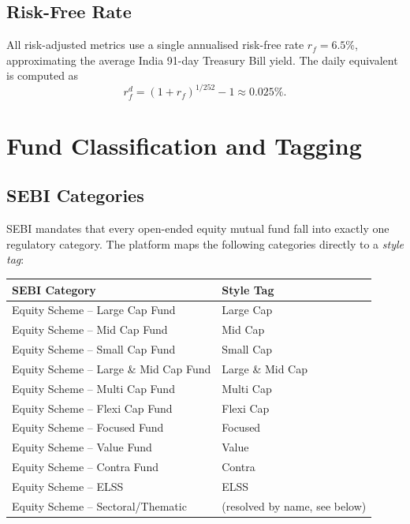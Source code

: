 \documentclass[12pt, a4paper]{article}
\newcommand{\rf}{r_f}
\begin{document}
\subsection{Risk-Free Rate}

All risk-adjusted metrics use a single annualised risk-free rate
$\rf = 6.5\%$, approximating the average India 91-day Treasury Bill yield.
The daily equivalent is computed as
\[
  r_f^d = (1 + \rf)^{1/252} - 1 \approx 0.025\%.
\]

\section{Fund Classification and Tagging}

\subsection{SEBI Categories}

SEBI mandates that every open-ended equity mutual fund fall into exactly
one regulatory category.  The platform maps the following categories
directly to a \emph{style tag}:

\begin{center}
\begin{tabular}{@{}ll@{}}
\toprule
SEBI Category & Style Tag \\
\midrule
Equity Scheme -- Large Cap Fund & Large Cap \\
Equity Scheme -- Mid Cap Fund & Mid Cap \\
Equity Scheme -- Small Cap Fund & Small Cap \\
Equity Scheme -- Large \& Mid Cap Fund & Large \& Mid Cap \\
Equity Scheme -- Multi Cap Fund & Multi Cap \\
Equity Scheme -- Flexi Cap Fund & Flexi Cap \\
Equity Scheme -- Focused Fund & Focused \\
Equity Scheme -- Value Fund & Value \\
Equity Scheme -- Contra Fund & Contra \\
Equity Scheme -- ELSS & ELSS \\
Equity Scheme -- Sectoral/Thematic & (resolved by name, see below) \\
\bottomrule
\end{tabular}
\end{center}
\end{document}
